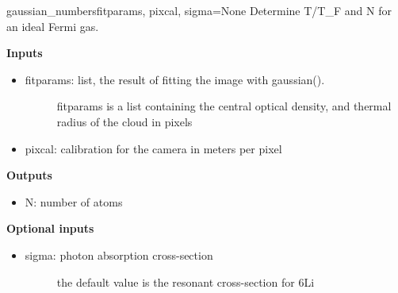 \documentclass[letterpaper,10pt,english]{manual}
\begin{document}
\hypertarget{fitfuncs.gaussian_numbers}{}\begin{funcdesc}{gaussian\_numbers}{fitparams, pixcal, sigma=None}
Determine T/T\_F and N for an ideal Fermi gas.

\textbf{Inputs}
\begin{itemize}
\item {} \begin{description}
\item[fitparams: list, the result of fitting the image with gaussian().]
fitparams is a list containing the central optical density,
and thermal radius of the cloud in pixels

\end{description}

\item {} 
pixcal: calibration for the camera in meters per pixel

\end{itemize}

\textbf{Outputs}
\begin{itemize}
\item {} 
N: number of atoms

\end{itemize}

\textbf{Optional inputs}
\begin{itemize}
\item {} \begin{description}
\item[sigma: photon absorption cross-section]
the default value is the resonant cross-section for 6Li

\end{description}

\end{itemize}
\end{funcdesc}
\end{document}
